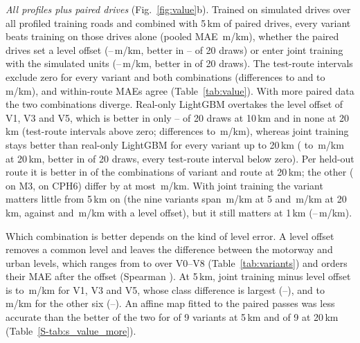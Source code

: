 \emph{All profiles plus paired drives} (Fig.~\ref{fig:value}b).
Trained on simulated drives over all profiled training roads and combined with 5\,km of paired drives, every variant beats training on those drives alone (pooled MAE \vbRealOnlyFive\,m/km), whether the paired drives set a level offset (\pcCalMaeFiveMin--\pcCalMaeFiveMax\,m/km, better in \pcCalWinsFiveMin--\pcCalWinsFiveMax{} of 20 draws) or enter joint training with the simulated units (\poMaeFiveMin--\poMaeFiveMax\,m/km, better in \poWinsFiveRange{} of 20 draws).
The test-route intervals exclude zero for every variant and both combinations (differences \cuCalFiveDiffMin{} to \cuCalFiveDiffMax{} and \cuPoolFiveDiffMin{} to \cuPoolFiveDiffMax\,m/km), and within-route MAEs agree (Table~\ref{tab:value}).
With more paired data the two combinations diverge.
Real-only LightGBM overtakes the level offset of V1, V3 and V5, which is better in only \pcCalHiDefWinsTenMin--\pcCalHiDefWinsTenMax{} of 20 draws at 10\,km and in none at 20\,km (test-route intervals above zero; differences \cuCalVoneTwenty{} to \cuCalVfiveTwenty\,m/km), whereas joint training stays better than real-only LightGBM for every variant up to 20\,km (\poDiffTwentyMin{} to \poDiffTwentyMax\,m/km at 20\,km, better in \poWinsTwentyRange{} of 20 draws, every test-route interval below zero).
Per held-out route it is better in \poRouteTwentyNeg{} of the \poRouteTwentyCells{} combinations of variant and route at 20\,km; the other \poRouteTwentyPos{} (\poRouteTwentyMwThreePos{} on M3, \poRouteTwentyCphSixPos{} on CPH6) differ by at most \poRouteTwentyDiffMax\,m/km.
With joint training the variant matters little from 5\,km on (the nine variants span \poMaeSpreadFive\,m/km at 5 and \poMaeSpreadTwenty\,m/km at 20\,km, against \poCalSpreadFive{} and \poCalSpreadTwenty\,m/km with a level offset), but it still matters at 1\,km (\poMaeOneMin--\poMaeOneMax\,m/km).

Which combination is better depends on the kind of level error.
A level offset removes a common level and leaves the difference between the motorway and urban levels, which ranges from \ldSpreadMin{} to \ldSpreadMax{} over V0--V8 (Table~\ref{tab:variants}) and orders their MAE after the offset (Spearman \ldSpreadCalRho).
At 5\,km, joint training minus level offset is \poHiDefDiffCalFiveMin{} to \poHiDefDiffCalFiveMax\,m/km for V1, V3 and V5, whose class difference is largest (\ldHiDefSpreadMin--\ldHiDefSpreadMax), and \poLoDefDiffCalFiveMin{} to \poLoDefDiffCalFiveMax\,m/km for the other six (\ldLoDefSpreadMin--\ldLoDefSpreadMax).
An affine map fitted to the paired passes was less accurate than the better of the two for \poAffWorseFive{} of 9 variants at 5\,km and \poAffWorseTwenty{} of 9 at 20\,km (Table~\ref{S-tab:s_value_more}).

